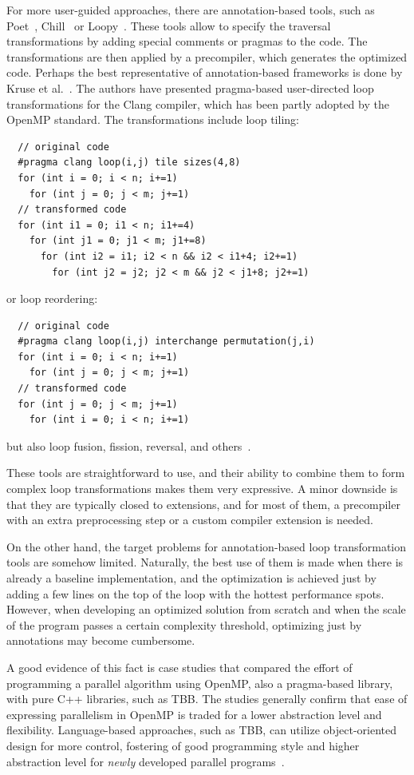 For more user-guided approaches, there are annotation-based tools, such as Poet~\cite{yi2007poet}, Chill~\cite{chen2008chill} or Loopy~\cite{namjoshi2016loopy}. These tools allow to specify the traversal transformations by adding special comments or pragmas to the code. The transformations are then applied by a precompiler, which generates the optimized code. Perhaps the best representative of annotation-based frameworks is done by Kruse et al.~\cite{kruse2018user}. The authors have presented pragma-based user-directed loop transformations for the Clang compiler, which has been partly adopted by the OpenMP standard. The transformations include loop tiling:
\begin{verbatim}
  // original code
  #pragma clang loop(i,j) tile sizes(4,8)
  for (int i = 0; i < n; i+=1)
    for (int j = 0; j < m; j+=1)
  // transformed code
  for (int i1 = 0; i1 < n; i1+=4)
    for (int j1 = 0; j1 < m; j1+=8)
      for (int i2 = i1; i2 < n && i2 < i1+4; i2+=1)
        for (int j2 = j2; j2 < m && j2 < j1+8; j2+=1)
\end{verbatim}
or loop reordering:
\begin{verbatim}
  // original code
  #pragma clang loop(i,j) interchange permutation(j,i)
  for (int i = 0; i < n; i+=1)
    for (int j = 0; j < m; j+=1)
  // transformed code
  for (int j = 0; j < m; j+=1)
    for (int i = 0; i < n; i+=1)
\end{verbatim}
but also loop fusion, fission, reversal, and others~\cite{mckinley1996improving}.

These tools are straightforward to use, and their ability to combine them to form complex loop transformations makes them very expressive. A minor downside is that they are typically closed to extensions, and for most of them, a precompiler with an extra preprocessing step or a custom compiler extension is needed.

On the other hand, the target problems for annotation-based loop transformation tools are somehow limited. Naturally, the best use of them is made when there is already a baseline implementation, and the optimization is achieved just by adding a few lines on the top of the loop with the hottest performance spots. However, when developing an optimized solution from scratch and when the scale of the program passes a certain complexity threshold, optimizing just by annotations may become cumbersome.

A good evidence of this fact is case studies that compared the effort of programming a parallel algorithm using OpenMP, also a pragma-based library, with pure C++ libraries, such as TBB. The studies generally confirm that ease of expressing parallelism in OpenMP is traded for a lower abstraction level and flexibility. Language-based approaches, such as TBB, can utilize object-oriented design for more control, fostering of good programming style and higher abstraction level for \emph{newly} developed parallel programs~\cite{kegel2009using,ajkunic2012comparison,refsnes2011comparison}.

